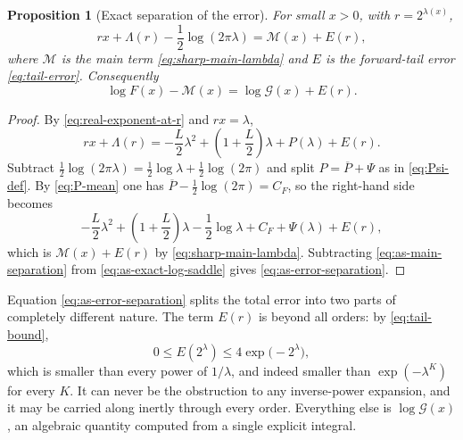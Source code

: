 \documentclass[11pt,oneside]{article}
\newtheorem{proposition}[theorem]{Proposition}
\theoremstyle{definition}
\theoremstyle{remark}
\begin{document}
\begin{proposition}[Exact separation of the error]
\label{prop:as-error-separation}
For small $x>0$, with $r=2^{\lambda(x)}$,
\begin{equation}
 rx+\Lambda(r)-\frac12\log(2\pi\lambda)=\mathcal M(x)+E(r), \label{eq:as-main-separation}
\end{equation}
where $\mathcal M$ is the main term \eqref{eq:sharp-main-lambda} and $E$ is the forward-tail
error \eqref{eq:tail-error}.  Consequently
\begin{equation}
 \boxed{
 \log F(x)-\mathcal M(x)=\log\mathcal G(x)+E(r).}         \label{eq:as-error-separation}
\end{equation}
\end{proposition}

\begin{proof}
By \eqref{eq:real-exponent-at-r} and $rx=\lambda$,
\begin{equation*}
 rx+\Lambda(r)
 =-\frac L2\lambda^2+\left(1+\frac L2\right)\lambda+P(\lambda)+E(r).
\end{equation*}
Subtract $\tfrac12\log(2\pi\lambda)=\tfrac12\log\lambda+\tfrac12\log(2\pi)$ and split
$P=\overline P+\Psi$ as in \eqref{eq:Psi-def}.  By \eqref{eq:P-mean} one has
$\overline P-\tfrac12\log(2\pi)=C_F$, so the right-hand side becomes
\begin{equation*}
 -\frac L2\lambda^2+\left(1+\frac L2\right)\lambda-\frac12\log\lambda
 +C_F+\Psi(\lambda)+E(r),
\end{equation*}
which is $\mathcal M(x)+E(r)$ by \eqref{eq:sharp-main-lambda}.  Subtracting
\eqref{eq:as-main-separation} from \eqref{eq:as-exact-log-saddle} gives
\eqref{eq:as-error-separation}.
\end{proof}

Equation \eqref{eq:as-error-separation} splits the total error into two parts of completely
different nature.  The term $E(r)$ is beyond all orders: by \eqref{eq:tail-bound},
\begin{equation}
 0\le E(2^{\lambda})\le4\exp\bigl(-2^{\lambda}\bigr),      \label{eq:as-tail-beyond}
\end{equation}
which is smaller than every power of $1/\lambda$, and indeed smaller than
$\exp(-\lambda^{K})$ for every $K$.  It can never be the obstruction to any inverse-power
expansion, and it may be carried along inertly through every order.  Everything else is
$\log\mathcal G(x)$, an algebraic quantity computed from a single explicit integral.
\end{document}
